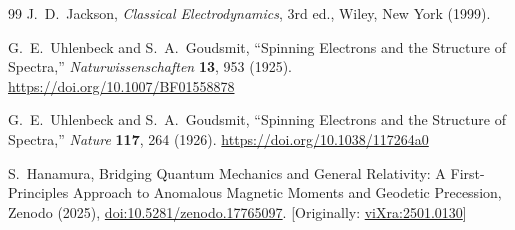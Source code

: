 \documentclass[%
 reprint,
 amsmath,amssymb,
 aps,
]{revtex4-1}
\numberwithin{equation}{section}%
\begin{document}
\begin{thebibliography}{99}
J.~D.~Jackson, 
\textit{Classical Electrodynamics}, 3rd ed., 
Wiley, New York (1999).

G.~E.~Uhlenbeck and S.~A.~Goudsmit, 
``Spinning Electrons and the Structure of Spectra,'' 
\textit{Naturwissenschaften} \textbf{13}, 953 (1925).
\href{https://doi.org/10.1007/BF01558878}{https://doi.org/10.1007/BF01558878}

G.~E.~Uhlenbeck and S.~A.~Goudsmit, 
``Spinning Electrons and the Structure of Spectra,'' 
\textit{Nature} \textbf{117}, 264 (1926).
\href{https://doi.org/10.1038/117264a0}{https://doi.org/10.1038/117264a0}

S.~Hanamura, Bridging Quantum Mechanics and General Relativity: A First-Principles Approach to Anomalous Magnetic Moments and Geodetic Precession, Zenodo (2025), \href{https://doi.org/10.5281/zenodo.17765097}{doi:10.5281/zenodo.17765097}. [Originally: \href{https://vixra.org/abs/2501.0130}{viXra:2501.0130}]

\end{thebibliography}

\end{document}
